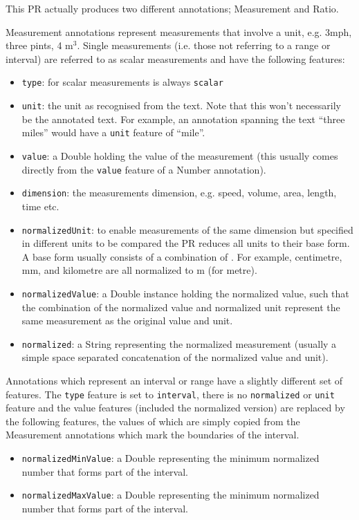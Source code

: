 This PR actually produces two different annotations; Measurement and Ratio.

Measurement annotations represent measurements that involve a unit, e.g. 3mph,
three pints, 4 m$^3$. Single measurements (i.e. those not referring to a range
or interval) are referred to as scalar measurements and have the following
features:
\begin{itemize}
\item \texttt{type}: for scalar measurements is always \texttt{scalar}
\item \texttt{unit}: the unit as recognised from the text. Note that this won't
  necessarily be the annotated text. For example, an annotation spanning the
 text ``three miles'' would have a \texttt{unit} feature of ``mile''.
\item \texttt{value}: a Double holding the value of the measurement (this
  usually comes directly from the \texttt{value} feature of a Number
 annotation).
\item \texttt{dimension}: the measurements dimension, e.g. speed, volume, area,
  length, time etc. 
\item \texttt{normalizedUnit}: to enable measurements of the same dimension but
  specified in different units to be compared the PR reduces all units to their
  base form. A base form usually consists of a combination of
  .
  For example, centimetre, mm, and kilometre are all normalized to m (for
  metre).
\item \texttt{normalizedValue}: a Double instance holding the normalized value,
  such that the combination of the normalized value and normalized unit
  represent the same measurement as the original value and unit. 
\item \texttt{normalized}: a String representing the normalized measurement
  (usually a simple space separated concatenation of the normalized value and
  unit).
\end{itemize}

Annotations which represent an interval or range have a slightly different set
of features. The \texttt{type} feature is set to \texttt{interval}, there is no
\texttt{normalized} or \texttt{unit} feature and the value features (included
the normalized version) are replaced by the following features, the values of
which are simply copied from the Measurement annotations which mark the
boundaries of the interval.

\begin{itemize}
\item \texttt{normalizedMinValue}: a Double representing the minimum normalized
  number that forms part of the interval. 
\item \texttt{normalizedMaxValue}: a Double representing the minimum normalized
  number that forms part of the interval.
\end{itemize}


